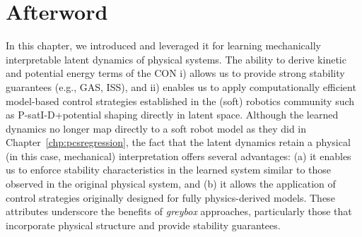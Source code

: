 \newpage








\section*{Afterword}
In this chapter, we introduced  and leveraged it for learning mechanically interpretable latent dynamics of physical systems.
The ability to derive kinetic and potential energy terms of the \gls{CON} i) allows us to provide strong stability guarantees (e.g., \gls{GAS}, \gls{ISS}), and ii) enables us to apply computationally efficient model-based control strategies established in the (soft) robotics community such as P-satI-D+potential shaping directly in latent space.
Although the learned dynamics no longer map directly to a soft robot model as they did in Chapter~\ref{chp:pcsregression}, the fact that the latent dynamics retain a physical (in this case, mechanical) interpretation offers several advantages: (a) it enables us to enforce stability characteristics in the learned system similar to those observed in the original physical system, and (b) it allows the application of control strategies originally designed for fully physics-derived models. These attributes underscore the benefits of \emph{greybox} approaches, particularly those that incorporate physical structure and provide stability guarantees.

